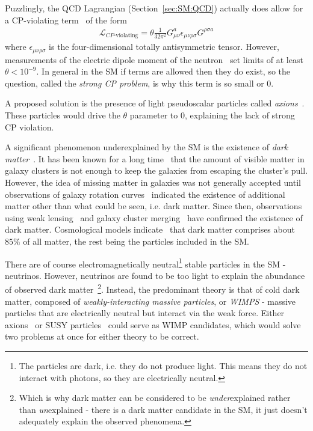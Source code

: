 Puzzlingly, the QCD Lagrangian (Section~\ref{sec:SM:QCD}) actually does allow for a CP-violating term~\cite{Dine:2000cj} of the form
\begin{align}
\mathcal{L}_\text{$CP$-violating} = \theta \frac{1}{32\pi^2}G_{\mu\nu}^a\epsilon_{\mu\nu\rho\sigma}G^{\rho\sigma a}
\end{align}
where $\epsilon_{\mu\nu\rho\sigma}$ is the four-dimensional totally antisymmetric tensor.
However, measurements of the electric dipole moment of the neutron~\cite{Baker:2006ts} set limits of at least $\theta < 10^{-9}$.
In general in the SM if terms are allowed then they do exist, so the question, called the \textit{strong CP problem}, is why this term is so small or $0$.

A proposed solution is the presence of light pseudoscalar particles called \textit{axions}~\cite{Peccei:1977hh,Baluni:1978rf,Crewther:1979pi,Peccei:1977ur,Weinberg:1977ma,Wilczek:1977pj}.
These particles would drive the $\theta$ parameter to $0$, explaining the lack of strong CP violation.

A significant phenomenon underexplained by the SM is the existence of \textit{dark matter}~\cite{Trimble:1987ee,Bertone:2010zza,darkmatter}.
It has been known for a long time~\cite{Zwicky:1937} that the amount of visible matter in galaxy clusters is not enough to keep the galaxies from escaping the cluster's pull.
However, the idea of missing matter in galaxies was not generally accepted until observations of galaxy rotation curves~\cite{rubin:1970,freeman:1970,vanAlbada:1984js} indicated the existence of additional matter other than what could be seen, i.e. dark matter.
Since then, observations using weak lensing~\cite{Clowe:2003tk} and galaxy cluster merging~\cite{Markevitch:2003at} have confirmed the existence of dark matter.
Cosmological models indicate~\cite{Aghanim:2018eyx} that dark matter comprises about $85\%$ of all matter, the rest being the particles included in the SM.

There are of course electromagnetically neutral\footnote{The particles are dark, i.e. they do not produce light. This means they do not interact with photons, so they are electrically neutral.}  stable particles in the SM - neutrinos. However, neutrinos are found to be too light to explain the abundance of observed dark matter~\cite{White:1984yj}\footnote{Which is why dark matter can be considered to be \textit{under}explained rather than \textit{un}explained - there is a dark matter candidate in the SM, it just doesn't adequately explain the observed phenomena.}.
Instead, the predominant theory is that of cold dark matter, composed of \textit{weakly-interacting massive particles}, or \textit{WIMPS} - massive particles that are electrically neutral but interact via the weak force.
Either axions~\cite{Raffelt:1995ym} or SUSY particles~\cite{Jungman:1995df} could serve as WIMP candidates, which would solve two problems at once for either theory to be correct. 

